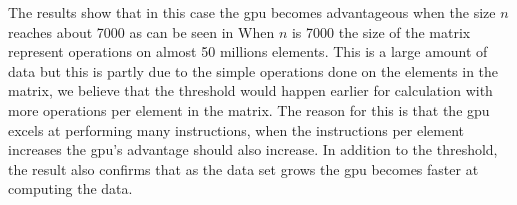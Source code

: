 The results show that in this case the \acrshort{gpu} becomes advantageous when the size  $n$ reaches about 7000 as can be seen in 
When $n$ is 7000 the size of the matrix represent operations on almost 50 millions elements.
This is a large amount of data but this is partly due to the simple operations done on the elements in the matrix, we believe that the threshold would happen earlier for calculation with more operations per element in the matrix.
The reason for this is that the \acrshort{gpu} excels at performing many instructions, when the instructions per element increases the \acrshort{gpu}'s advantage should also increase.
In addition to the threshold, the result also confirms that as the data set grows the \acrshort{gpu} becomes  faster at computing the data. 
